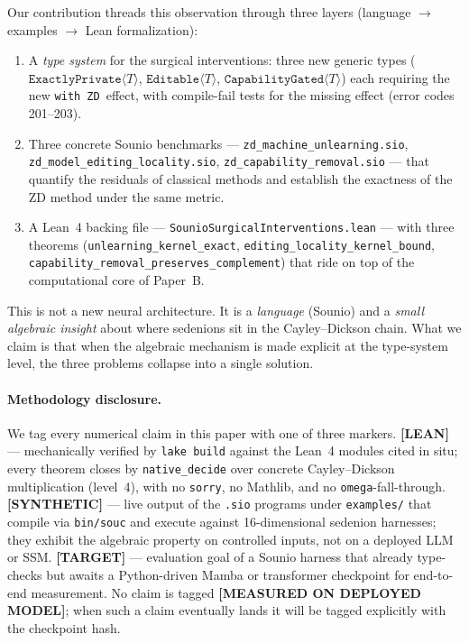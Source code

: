 \documentclass{article}
\newcommand{\ExactlyPrivate}[1]{\texttt{ExactlyPrivate}\langle #1 \rangle}
\newcommand{\Editable}[1]{\texttt{Editable}\langle #1 \rangle}
\newcommand{\CapabilityGated}[1]{\texttt{CapabilityGated}\langle #1 \rangle}
\newcommand{\withZD}{\texttt{with ZD}}
\begin{document}
Our contribution threads this observation through three layers
(language $\to$ examples $\to$ Lean formalization):
\begin{enumerate}
\item A \emph{type system} for the surgical interventions: three new generic
      types ($\ExactlyPrivate{T}$, $\Editable{T}$, $\CapabilityGated{T}$)
      each requiring the new \withZD~effect, with compile-fail tests for
      the missing effect (error codes 201--203).
\item Three concrete Sounio benchmarks --- \texttt{zd\_machine\_unlearning.sio},
      \texttt{zd\_model\_editing\_locality.sio}, \texttt{zd\_capability\_removal.sio}
      --- that quantify the residuals of classical methods and establish the
      exactness of the ZD method under the same metric.
\item A Lean~4 backing file --- \texttt{SounioSurgicalInterventions.lean} ---
      with three theorems (\texttt{unlearning\_kernel\_exact},
      \texttt{editing\_locality\_kernel\_bound},
      \texttt{capability\_removal\_preserves\_complement}) that ride on
      top of the computational core of Paper~B.
\end{enumerate}

This is not a new neural architecture.  It is a \emph{language} (Sounio) and
a \emph{small algebraic insight} about where sedenions sit in the Cayley--Dickson
chain.  What we claim is that when the algebraic mechanism is made explicit
at the type-system level, the three problems collapse into a single solution.

\paragraph{Methodology disclosure.}
We tag every numerical claim in this paper with one of three markers.
\textbf{[LEAN]} --- mechanically verified by \texttt{lake build} against
the Lean~4 modules cited in situ; every theorem closes by
\texttt{native\_decide} over concrete Cayley--Dickson multiplication
(level~4), with no \texttt{sorry}, no Mathlib, and no \texttt{omega}-fall-through.
\textbf{[SYNTHETIC]} --- live output of the \texttt{.sio} programs under
\texttt{examples/} that compile via \texttt{bin/souc} and execute against
16-dimensional sedenion harnesses; they exhibit the algebraic property on
controlled inputs, not on a deployed LLM or SSM.
\textbf{[TARGET]} --- evaluation goal of a Sounio harness that already
type-checks but awaits a Python-driven Mamba or transformer checkpoint
for end-to-end measurement.
No claim is tagged \textbf{[MEASURED ON DEPLOYED MODEL]}; when such a claim
eventually lands it will be tagged explicitly with the checkpoint hash.
\end{document}
